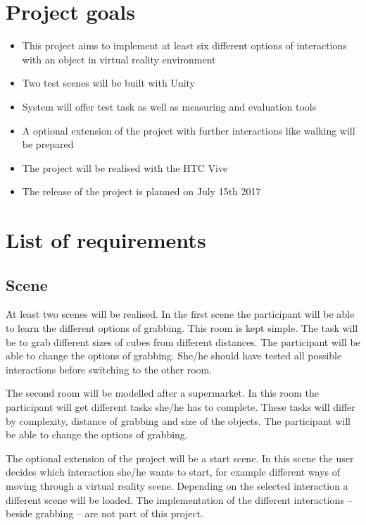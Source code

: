 \documentclass[a4paper, 12pt]{article}
\newcommand{\changefont}[3]{
\fontfamily{#1} \fontseries{#2} \fontshape{#3} \selectfont}
\begin{document}



    
\section{Project goals}

\begin{itemize}
\item This project aims to implement at least six different options of interactions with an object in virtual reality environment 
\item Two test scenes will be built with Unity
\item System will offer test task as well as measuring and evaluation tools
\item A optional extension of the project with further interactions like walking will be prepared
\item The project will be realised with the HTC Vive
\item The release of the project is planned on July 15th 2017
\end{itemize}

\section{List of requirements}
\subsection{Scene}
At least two scenes will be realised. In the first scene the participant will be able to learn the different options of grabbing. This room is kept simple. The task will be to grab different sizes of cubes from different distances. The participant will be able to change the options of grabbing. She/he should have tested all possible interactions before switching to the other room.

The second room will be modelled after a supermarket. In this room the participant will get different tasks she/he has to complete. These tasks will differ by complexity, distance of grabbing and size of the objects. The participant will be able to change the options of grabbing.

The optional extension of the project will be a start scene. In this scene the user decides which interaction she/he wants to start, for example different ways of moving through a virtual reality scene. Depending on the selected interaction a different scene will be loaded. The implementation of the different interactions -- beside grabbing -- are not part of this project. 
\end{document}
